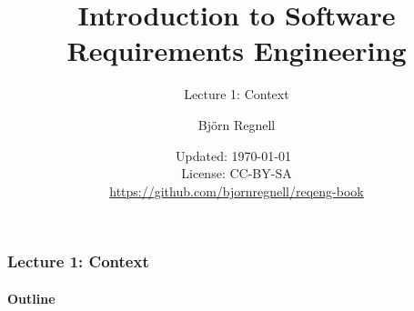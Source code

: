 \documentclass{reqenglecture}
\title{Introduction to Software Requirements Engineering}
\subtitle{Lecture 1: Context}
\author{Björn Regnell}
\date{\vspace{1em}\footnotesize Updated: \today~
\\ License: CC-BY-SA 
\\ \url{https://github.com/bjornregnell/reqeng-book} 
}
\begin{document}
\maketitle

\begin{frame}
\frametitle{Lecture 1: Context}
\framesubtitle{Outline}
\tableofcontents
\end{frame}






\end{document}
